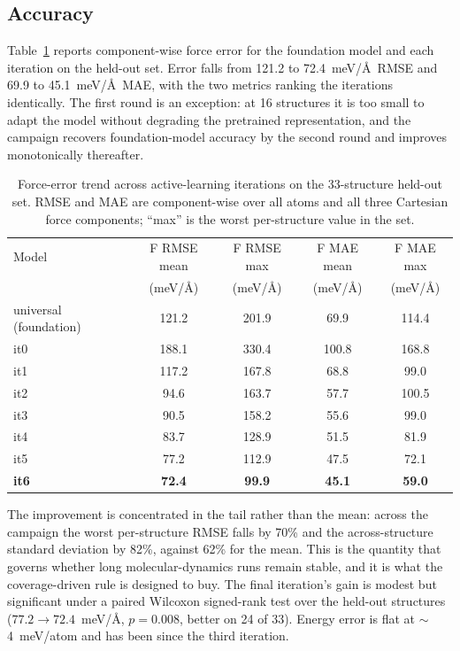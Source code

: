 \documentclass[11pt]{article}
\begin{document}
\subsection{Accuracy}

Table~\ref{tab:force-trend} reports component-wise force error for the
foundation model and each iteration on the held-out set. Error falls from 121.2
to 72.4~meV/\AA\ RMSE and 69.9 to 45.1~meV/\AA\ MAE, with the two metrics
ranking the iterations identically. The first round is an exception: at 16
structures it is too small to adapt the model without degrading the pretrained
representation, and the campaign recovers foundation-model accuracy by the
second round and improves monotonically thereafter.

\begin{table}[htbp]
\centering
\caption{Force-error trend across active-learning iterations on the
33-structure held-out set. RMSE and MAE are component-wise over all atoms and
all three Cartesian force components; ``max'' is the worst per-structure value
in the set.}
\label{tab:force-trend}
\begin{tabular}{lcccc}
\toprule
Model & F RMSE mean & F RMSE max & F MAE mean & F MAE max \\
 & (meV/\AA) & (meV/\AA) & (meV/\AA) & (meV/\AA) \\
\midrule
universal (foundation) & 121.2 & 201.9 & 69.9  & 114.4 \\
it0                     & 188.1 & 330.4 & 100.8 & 168.8 \\
it1                     & 117.2 & 167.8 & 68.8  & 99.0  \\
it2                     & 94.6  & 163.7 & 57.7  & 100.5 \\
it3                     & 90.5  & 158.2 & 55.6  & 99.0  \\
it4                     & 83.7  & 128.9 & 51.5  & 81.9  \\
it5                     & 77.2  & 112.9 & 47.5  & 72.1  \\
\textbf{it6}            & \textbf{72.4} & \textbf{99.9} & \textbf{45.1} & \textbf{59.0} \\
\bottomrule
\end{tabular}
\end{table}

The improvement is concentrated in the tail rather than the mean: across the
campaign the worst per-structure RMSE falls by 70\% and the across-structure
standard deviation by 82\%, against 62\% for the mean. This is the quantity
that governs whether long molecular-dynamics runs remain stable, and it is
what the coverage-driven rule is designed to buy. The final iteration's gain is
modest but significant under a paired Wilcoxon signed-rank test over the
held-out structures ($77.2\rightarrow72.4$~meV/\AA, $p=0.008$, better on 24 of
33). Energy error is flat at $\sim$4~meV/atom and has been since the third
iteration.
\end{document}
